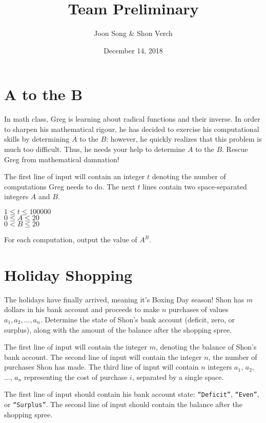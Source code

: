 \documentclass{problem-set}
\title{Team Preliminary \RNum{1}}
\date{December 14, 2018}
\author{Joon Song & Shon Verch}
\begin{document}
\maketitle

\section{$\boldsymbol{A}$ to the $\boldsymbol{B}$}

In math class, Greg is learning about radical functions and their inverse. In order to sharpen his mathematical rigour, he has decided to exercise his computational skills by determining $A$ to the $B$; however, he quickly realizes that this problem is much too difficult. Thus, he needs your help to determine $A$ to the $B$. Rescue Greg from mathematical damnation!

The first line of input will contain an integer $t$ denoting the number of computations Greg needs to do. The next $t$ lines contain two space-separated integers $A$ and $B$.

\constraints
$1 \leq t \leq 100000$\\
$0 \leq A \leq 20$\\
$0 < B \leq 20$

\outputformat
For each computation, output the value of $A^B$.


\newpage
\section{Holiday Shopping}
The holidays have finally arrived, meaning it's Boxing Day season! Shon has $m$ dollars in his bank account and proceeds to make $n$ purchases of values $a_1, a_2, \dots, a_n$. Determine the state of Shon's bank account (deficit, zero, or surplus), along with the amount of the balance after the shopping spree.

The first line of input will contain the integer $m$, denoting the balance of Shon's bank account. The second line of input will contain the integer $n$, the number of purchases Shon has made. The third line of input will contain $n$ integers $a_1$, $a_2$, $\ldots$, $a_n$ representing the cost of purchase $i$, separated by a single space.

\outputformat
The first line of input should contain his bank account state: \texttt{``Deficit''}, \texttt{``Even''}, or \texttt{``Surplus''}. The second line of input should contain the balance after the shopping spree.
\end{document}
